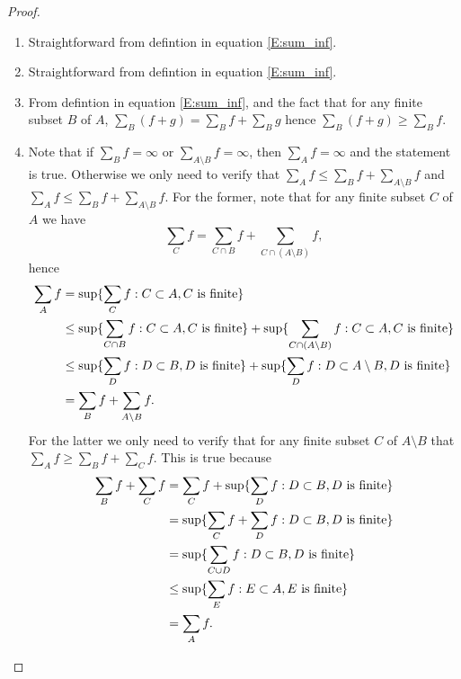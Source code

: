 \begin{proof}
\begin{enumerate}
\item Straightforward from defintion in equation \ref{E:sum_inf}.
\item Straightforward from defintion in equation \ref{E:sum_inf}.
\item From defintion in equation \ref{E:sum_inf}, and the fact that for any
  finite subset $B$ of $A$, $\sum_B (f+g)=\sum_B f + \sum_B g$ hence 
  $\sum_B (f+g)\geq \sum_B f$.
\item Note that if $\sum_B f=\infty$ or $\sum_{A\setminus B} f=\infty$, then 
  $\sum_A f=\infty$ and the statement is true. Otherwise we only need to 
  verify that $\sum_A f \leq \sum_B f + \sum_{A\setminus B} f$ and
  $\sum_A f \leq \sum_B f + \sum_{A\setminus B} f$.
  For the former, note that for any finite subset $C$ of $A$ we have
  \[
    \sum_C f = \sum_{C\cap B} f + \sum_{C\cap (A\setminus B)} f,
  \]
  hence
  \begin{align*}
    \sum_A f 
      &= \sup\{ \sum_C f: C\subset A, \text{$C$ is finite} \} \notag \\
      &\leq \sup\{ \sum_{C\cap B} f: C\subset A, \text{$C$ is finite} \}
            + \sup\{ \sum_{C\cap (A\setminus B)} f
                    : C\subset A, \text{$C$ is finite} \} \notag \\
      &\leq \sup\{ \sum_D f: D\subset B, \text{$D$ is finite} \}
            + \sup\{ \sum_D f: D\subset A\setminus B, \text{$D$ is finite} \} 
       \notag \\
      &= \sum_B f + \sum_{A\setminus B} f. \notag \\
  \end{align*}
  For the latter we only need to verify that for any finite subset $C$ of
  $A\setminus B$ that $\sum_A f\geq \sum_B f + \sum_C f$. This is true because
  \begin{align*}
    \sum_B f + \sum_C f
      &= \sum_C f + \sup\{ \sum_D f: D\subset B, \text{$D$ is finite} \} 
         \notag \\
      &= \sup\{ \sum_C f + \sum_D f: D\subset B, \text{$D$ is finite} \} 
         \notag \\
      &= \sup\{ \sum_{C\cup D} f: D\subset B, \text{$D$ is finite} \} 
         \notag \\
      &\leq \sup\{ \sum_E f: E\subset A, \text{$E$ is finite} \}  \notag \\
      &= \sum_A f. \notag \\

\end{align*}
\end{enumerate}
\end{proof}
